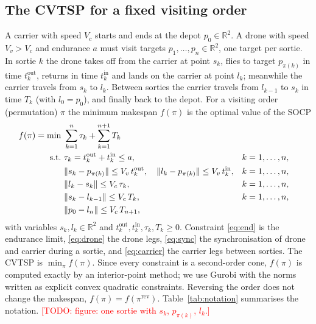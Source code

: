 \documentclass[preprint,review,12pt,authoryear]{elsarticle}
\newcommand{\todo}[1]{\textcolor{red}{[TODO: #1]}}
\newcommand{\R}{\mathbb{R}}
\begin{document}
\subsection{The CVTSP for a fixed visiting order}
A carrier with speed $V_c$ starts and ends at the depot $p_0\in\R^2$. A drone with speed $V_v>V_c$ and
endurance $a$ must visit targets $p_1,\dots,p_n\in\R^2$, one target per sortie. In sortie $k$ the drone takes
off from the carrier at point $s_k$, flies to target $p_{\pi(k)}$ in time $t^{\mathrm{out}}_k$, returns in
time $t^{\mathrm{in}}_k$ and lands on the carrier at point $l_k$; meanwhile the carrier travels from $s_k$ to
$l_k$. Between sorties the carrier travels from $l_{k-1}$ to $s_k$ in time $T_k$ (with $l_0=p_0$), and finally
back to the depot. For a visiting order (permutation) $\pi$ the minimum makespan $f(\pi)$ is the optimal value of
the SOCP
\begin{align}
f(\pi)=\min\ & \sum_{k=1}^{n} \tau_k + \sum_{k=1}^{n+1} T_k \label{eq:obj}\\
\text{s.t.}\ & \tau_k = t^{\mathrm{out}}_k + t^{\mathrm{in}}_k \le a, && k=1,\dots,n, \label{eq:end}\\
& \|s_k - p_{\pi(k)}\| \le V_v\, t^{\mathrm{out}}_k,\quad \|l_k - p_{\pi(k)}\| \le V_v\, t^{\mathrm{in}}_k,
 && k=1,\dots,n, \label{eq:drone}\\
& \|l_k - s_k\| \le V_c\, \tau_k, && k=1,\dots,n, \label{eq:sync}\\
& \|s_k - l_{k-1}\| \le V_c\, T_k, && k=1,\dots,n, \label{eq:carrier}\\
& \|p_0 - l_n\| \le V_c\, T_{n+1}, \notag
\end{align}
with variables $s_k,l_k\in\R^2$ and $t^{\mathrm{out}}_k,t^{\mathrm{in}}_k,\tau_k,T_k\ge0$.
Constraint \eqref{eq:end} is the endurance limit, \eqref{eq:drone} the drone legs, \eqref{eq:sync} the
synchronisation of drone and carrier during a sortie, and \eqref{eq:carrier} the carrier legs between
sorties. The CVTSP is $\min_\pi f(\pi)$. Since every constraint is a second-order cone, $f(\pi)$ is computed
exactly by an interior-point method; we use Gurobi with the norms written as explicit convex quadratic
constraints. Reversing the order does not change the makespan, $f(\pi)=f(\pi^{\mathrm{rev}})$.
Table~\ref{tab:notation} summarises the notation. \todo{figure: one sortie with $s_k$, $p_{\pi(k)}$, $l_k$.}
\end{document}
